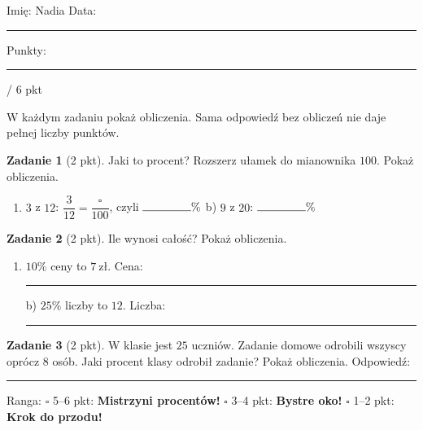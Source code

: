 \documentclass[11pt,a4paper]{article}
\begin{document}

\vspace{0.2em}
Imię: Nadia \hfill Data: \rule{3cm}{0.4pt} \hfill Punkty: \rule{1.2cm}{0.4pt} / 6 pkt

{\small W każdym zadaniu pokaż obliczenia. Sama odpowiedź bez obliczeń nie daje pełnej liczby punktów.}

\vspace{0.4em}

\textbf{Zadanie 1} (2 pkt). Jaki to procent? Rozszerz ułamek do mianownika $100$. Pokaż obliczenia.
\begin{enumerate}[label=\alph*), leftmargin=*, itemsep=2pt]
  \item $3$ z $12$: $\dfrac{3}{12}=\dfrac{\square}{100}$, czyli $\rule{1.5cm}{0.4pt}\%$ \hspace{1cm} b) $9$ z $20$: $\rule{1.5cm}{0.4pt}\%$
\end{enumerate}
\miejsce{4cm}

\textbf{Zadanie 2} (2 pkt). Ile wynosi całość? Pokaż obliczenia.
\begin{enumerate}[label=\alph*), leftmargin=*, itemsep=2pt]
  \item $10\%$ ceny to $7\ \text{zł}$. Cena: \rule{2.5cm}{0.4pt} \hspace{0.5cm} b) $25\%$ liczby to $12$. Liczba: \rule{2.5cm}{0.4pt}
\end{enumerate}
\miejsce{4.5cm}

\textbf{Zadanie 3} (2 pkt). W klasie jest $25$ uczniów. Zadanie domowe odrobili wszyscy oprócz $8$ osób. Jaki procent klasy odrobił zadanie? Pokaż obliczenia.
\miejsce{5cm}
Odpowiedź: \rule{4cm}{0.4pt}

\vfill
\begin{tcolorbox}[colback=white, colframe=cel, boxrule=0.6pt, arc=2pt]
Ranga: \quad $\square$ 5--6 pkt: \textbf{Mistrzyni procentów!} \quad $\square$ 3--4 pkt: \textbf{Bystre oko!} \quad $\square$ 1--2 pkt: \textbf{Krok do przodu!}
\end{tcolorbox}
\end{document}
